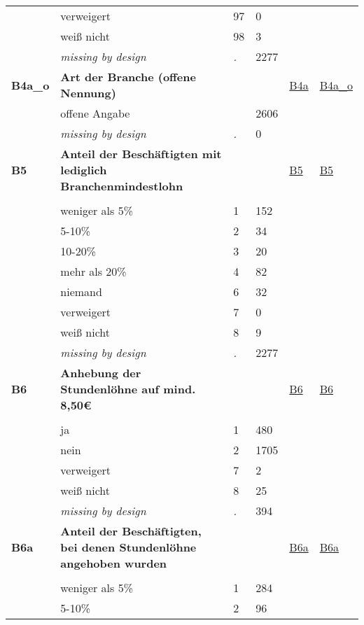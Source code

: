 \begin{longtable}{| L{2.45cm} | L{6cm} | C{1.5cm} | R{1cm} | C{2.25cm} | C{2.25cm} |}
   & verweigert & 97 & 0 &  &  \\ 
   & weiß nicht & 98 & 3 &  &  \\ 
   & \textit{missing by design} & \textit{.} & 2277 &  &  \\ 
   \midrule
\textbf{B4a\_o}\label{var:B4a:o} & \textbf{Art der Branche (offene Nennung)} &  &  & \hyperref[B4a]{B4a} & \hyperref[var:suf:B4a:o]{B4a\_o} \\ 
   & offene Angabe &  & 2606 &  &  \\ 
   & \textit{missing by design} & \textit{.} & 0 &  &  \\ 
   \midrule
\textbf{B5}\label{var:B5} & \textbf{Anteil der Beschäftigten mit lediglich Branchenmindestlohn} &  &  & \hyperref[B5]{B5} & \hyperref[var:suf:B5]{B5} \\ 
   &  &  &  &  &  \\ 
   & weniger als 5\% & 1 & 152 &  &  \\ 
   & 5-10\% & 2 & 34 &  &  \\ 
   & 10-20\% & 3 & 20 &  &  \\ 
   & mehr als 20\% & 4 & 82 &  &  \\ 
   & niemand & 6 & 32 &  &  \\ 
   & verweigert & 7 & 0 &  &  \\ 
   & weiß nicht & 8 & 9 &  &  \\ 
   & \textit{missing by design} & \textit{.} & 2277 &  &  \\ 
   \midrule
\textbf{B6}\label{var:B6} & \textbf{Anhebung der Stundenlöhne auf mind. 8,50€} &  &  & \hyperref[B6]{B6} & \hyperref[var:suf:B6]{B6} \\ 
   &  &  &  &  &  \\ 
   & ja & 1 & 480 &  &  \\ 
   & nein & 2 & 1705 &  &  \\ 
   & verweigert & 7 & 2 &  &  \\ 
   & weiß nicht & 8 & 25 &  &  \\ 
   & \textit{missing by design} & \textit{.} & 394 &  &  \\ 
   \midrule
\textbf{B6a}\label{var:B6a} & \textbf{Anteil der Beschäftigten, bei denen Stundenlöhne angehoben wurden} &  &  & \hyperref[B6a]{B6a} & \hyperref[var:suf:B6a]{B6a} \\ 
   &  &  &  &  &  \\ 
   & weniger als 5\% & 1 & 284 &  &  \\ 
   & 5-10\% & 2 & 96 &  &  \\ 

\end{longtable}
